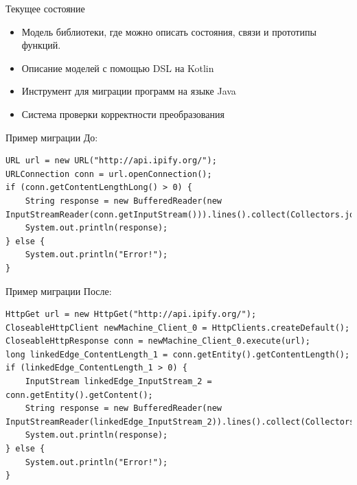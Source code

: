\documentclass[12pt]{beamer}
\begin{document}
{
\begin{frame}[fragile]{Текущее состояние}
  \begin{mybox}[]
  \begin{itemize}
  	\item Модель библиотеки, где можно описать состояния, связи и прототипы функций.
  	\item Описание моделей с помощью DSL на Kotlin
  	\item Инструмент для миграции программ на языке Java
  	\item Система проверки корректности преобразования
  \end{itemize}
  \end{mybox}
\end{frame}
}

\begin{frame}[fragile]{Пример миграции}
До:
\begin{lstlisting}
URL url = new URL("http://api.ipify.org/");
URLConnection conn = url.openConnection();
if (conn.getContentLengthLong() > 0) {
    String response = new BufferedReader(new InputStreamReader(conn.getInputStream())).lines().collect(Collectors.joining("\n"));
    System.out.println(response);
} else {
    System.out.println("Error!");
}
\end{lstlisting}
\end{frame}

\begin{frame}[fragile]{Пример миграции}
После:
\begin{lstlisting}[basicstyle=\ttfamily\scriptsize]
HttpGet url = new HttpGet("http://api.ipify.org/");
CloseableHttpClient newMachine_Client_0 = HttpClients.createDefault();
CloseableHttpResponse conn = newMachine_Client_0.execute(url);
long linkedEdge_ContentLength_1 = conn.getEntity().getContentLength();
if (linkedEdge_ContentLength_1 > 0) {
    InputStream linkedEdge_InputStream_2 = conn.getEntity().getContent();
    String response = new BufferedReader(new InputStreamReader(linkedEdge_InputStream_2)).lines().collect(Collectors.joining("\n"));
    System.out.println(response);
} else {
    System.out.println("Error!");
}
\end{lstlisting}
\end{frame}
\end{document}
